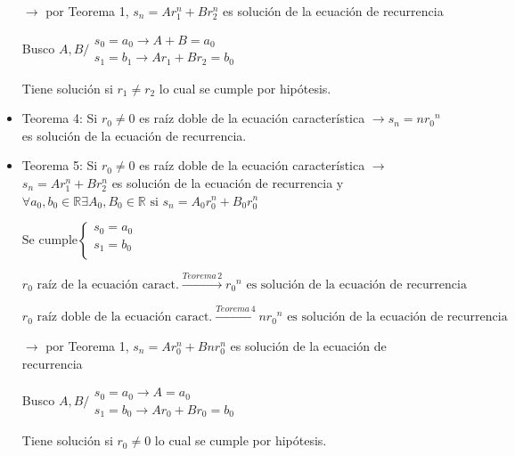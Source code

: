 \begin{itemize}
	\begin{center}
		$\rightarrow$ por Teorema 1, $s_n = Ar_{1}^n + Br_{2}^n$ es solución de la ecuación de recurrencia
	\end{center}
	
	Busco $A,B/ \begin{array}{c}
	s_0 = a_0 \rightarrow A+B=a_0\\
	s_1 = b_1 \rightarrow Ar_1+Br_2=b_0\end{array}$
	
	Tiene solución si $r_1 \neq r_2$ lo cual se cumple por hipótesis.
	
	\item Teorema 4: Si $r_0 \neq 0$ es raíz doble de la ecuación característica $\rightarrow s_n = n {r_0}^n$ es solución de la ecuación de recurrencia.
	
	\item Teorema 5: Si $r_0 \neq 0$ es raíz doble de la ecuación característica $\rightarrow$ $s_{n}=Ar_{1}^n + Br_{2}^n$ 
	es solución de la ecuación de recurrencia y $\forall a_{0},b_{0} \in \mathbb{R} \exists A_{0},B_{0} \in \mathbb{R} \text{ si } s_{n}=A_{0}r_{0}^n + B_{0}r_{0}^n$
	
	\begin{center}
		$\text{Se cumple} \left\{ \begin{array}{c}
		s_0 = a_0\\
		s_1 = b_0\\
		\end{array}\right.$
	\end{center}
	
	$r_0 \text{ raíz de la ecuación caract.} \overset{Teorema\,2}{\rightarrow} {r_0}^n \text{ es solución de la ecuación de recurrencia}$
	
	$r_0 \text{ raíz doble de la ecuación caract.} \overset{Teorema\,4}{\rightarrow} {nr_0}^n \text{ es solución de la ecuación de recurrencia}$
	
	\begin{center}
		$\rightarrow$ por Teorema 1, $s_n = Ar_{0}^n + Bnr_{0}^n$ es solución de la ecuación de recurrencia
	\end{center}
	
	Busco $A,B/ \begin{array}{c}
	s_0 = a_0 \rightarrow A=a_0\\
	s_1 = b_0 \rightarrow Ar_0+Br_0=b_0\end{array}$
	
	Tiene solución si $r_0 \neq 0$ lo cual se cumple por hipótesis.
\end{itemize}

